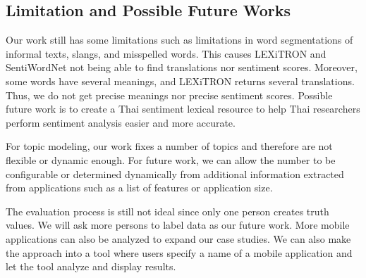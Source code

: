 \subsection*{Limitation and Possible Future Works}
Our work still has some limitations such as limitations in word segmentations of informal texts, slangs, and misspelled words. This causes LEXiTRON and SentiWordNet not being able to find translations nor sentiment scores. Moreover, some words have several meanings, and LEXiTRON returns several translations. Thus, we do not get precise meanings nor precise sentiment scores. Possible future work is to create a Thai sentiment lexical resource to help Thai researchers perform sentiment analysis easier and more accurate.

For topic modeling, our work fixes a number of topics and therefore are not flexible or dynamic enough. For future work, we can allow the number to be configurable or determined dynamically from additional information extracted from applications such as a list of features or application size.

The evaluation process is still not ideal since only one person creates truth values. We will ask more persons to label data as our future work. More mobile applications can also be analyzed to expand our case studies. We can also make the approach into a tool where users specify a name of a mobile application and let the tool analyze and display results.


%
%


